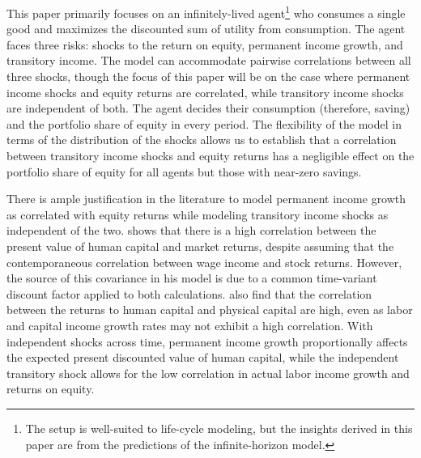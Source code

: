 This paper primarily focuses on an infinitely-lived agent\footnote{The setup is well-suited to life-cycle modeling, but the insights derived in this paper are from the predictions of the infinite-horizon model.} who consumes a single good and maximizes the discounted sum of utility from consumption. The agent faces three risks: shocks to the return on equity, permanent income growth, and transitory income. The model can accommodate pairwise correlations between all three shocks, though the focus of this paper will be on the case where permanent income shocks and equity returns are correlated, while transitory income shocks are independent of both. The agent decides their consumption (therefore, saving) and the portfolio share of equity in every period. The flexibility of the model in terms of the distribution of the shocks allows us to establish that a correlation between transitory income shocks and equity returns has a negligible effect on the portfolio share of equity for all agents but those with near-zero savings.

There is ample justification in the literature to model permanent income growth as correlated with equity returns while modeling transitory income shocks as independent of the two. \citet{Campbell1996} shows that there is a high correlation between the present value of human capital and market returns, despite assuming that the contemporaneous correlation between wage income and stock returns. However, the source of this covariance in his model is due to a common time-variant discount factor applied to both calculations. \citet{Baxter1997} also find that the correlation between the returns to human capital and physical capital are high, even as labor and capital income growth rates may not exhibit a high correlation. With independent shocks across time, permanent income growth proportionally affects the expected present discounted value of human capital, while the independent transitory shock allows for the low correlation in actual labor income growth and returns on equity.

